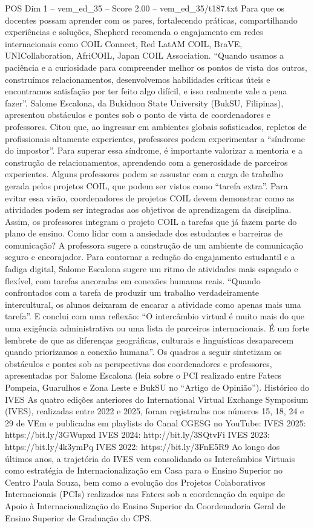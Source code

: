 \begin{textsample}{POS Dim 1 – vem\_ed\_35 – Score 2.00 – vem\_ed\_35/t187.txt}
Para que os docentes possam aprender com os pares, fortalecendo práticas, compartilhando experiências e soluções, Shepherd recomenda o engajamento em redes internacionais como COIL Connect, Red LatAM COIL, BraVE, UNICollaboration, AfriCOIL, Japan COIL Association. “Quando usamos a paciência e a curiosidade para compreender melhor os pontos de vista dos outros, construímos relacionamentos, desenvolvemos habilidades críticas úteis e encontramos satisfação por ter feito algo difícil, e isso realmente vale a pena fazer”.
Salome Escalona, da Bukidnon State University (BukSU, Filipinas), apresentou obstáculos e pontes sob o ponto de vista de coordenadores e professores.
Citou que, ao ingressar em ambientes globais sofisticados, repletos de profissionais altamente experientes, professores podem experimentar a “síndrome do impostor”.
Para superar essa síndrome, é importante valorizar a mentoria e a construção de relacionamentos, aprendendo com a generosidade de parceiros experientes.
Alguns professores podem se assustar com a carga de trabalho gerada pelos projetos COIL, que podem ser vistos como “tarefa extra”.
Para evitar essa visão, coordenadores de projetos COIL devem demonstrar como as atividades podem ser integradas aos objetivos de aprendizagem da disciplina.
Assim, os professores integram o projeto COIL a tarefas que já fazem parte do plano de ensino.
Como lidar com a ansiedade dos estudantes e barreiras de comunicação?
A professora sugere a construção de um ambiente de comunicação seguro e encorajador.
Para contornar a redução do engajamento estudantil e a fadiga digital, Salome Escalona sugere um ritmo de atividades mais espaçado e flexível, com tarefas ancoradas em conexões humanas reais. “Quando confrontados com a tarefa de produzir um trabalho verdadeiramente intercultural, os alunos deixaram de encarar a atividade como apenas mais uma tarefa”.
E conclui com uma reflexão: “O intercâmbio virtual é muito mais do que uma exigência administrativa ou uma lista de parceiros internacionais.
É um forte lembrete de que as diferenças geográficas, culturais e linguísticas desaparecem quando priorizamos a conexão humana”.
Os quadros a seguir sintetizam os obstáculos e pontes sob as perspectivas dos coordenadores e professores, apresentadas por Salome Escalona (leia sobre o PCI realizado entre Fatecs Pompeia, Guarulhos e Zona Leste e BukSU no “Artigo de Opinião”).
Histórico do IVES As quatro edições anteriores do International Virtual Exchange Symposium (IVES), realizadas entre 2022 e 2025, foram registradas nos números 15, 18, 24 e 29 de VEm e publicadas em playlists do Canal CGESG no YouTube: IVES 2025: https://bit.ly/3GWupxd IVES 2024: http://bit.ly/3SQtvFi IVES 2023: https://bit.ly/4k3ymPq IVES 2022: https://bit.ly/3FnE5R9 Ao longo dos últimos anos, a trajetória do IVES vem consolidando os Intercâmbios Virtuais como estratégia de Internacionalização em Casa para o Ensino Superior no Centro Paula Souza, bem como a evolução dos Projetos Colaborativos Internacionais (PCIs) realizados nas Fatecs sob a coordenação da equipe de Apoio à Internacionalização do Ensino Superior da Coordenadoria Geral de Ensino Superior de Graduação do CPS.

\end{textsample}
